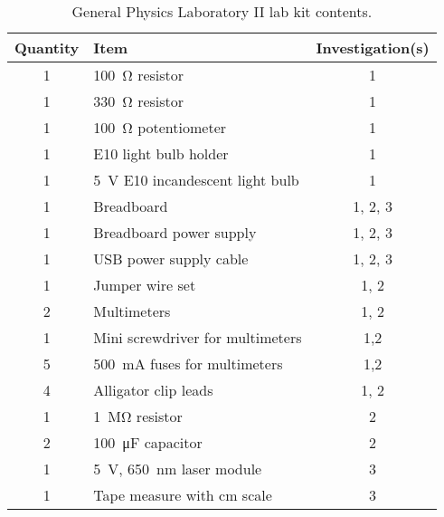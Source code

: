 \documentclass[aip, numerical, preprint]{revtex4-2}
\begin{document}
\begin{table}
  \caption{\label{tab: 1261 lab kit} General Physics Laboratory II lab kit contents.}
  \begin{tabular}{clc}
    \hline\hline
    Quantity & Item & Investigation(s)\\
    \hline
    1 & \SI{100}{\ohm} resistor & 1 \\
    1 & \SI{330}{\ohm} resistor & 1 \\
    1 & \SI{100}{\ohm} potentiometer & 1 \\
    1 & E10 light bulb holder & 1 \\
    1 & \SI{5}{V} E10 incandescent light bulb & 1 \\
    1 & Breadboard & 1, 2, 3 \\
    1 & Breadboard power supply & 1, 2, 3 \\
    1 & USB power supply cable & 1, 2, 3 \\
    1 & Jumper wire set & 1, 2 \\
    2 & Multimeters & 1, 2 \\
    1 & Mini screwdriver for multimeters & 1,2 \\
    5 & \SI{500}{mA} fuses for multimeters & 1,2 \\
    4 & Alligator clip leads & 1, 2 \\
    1 & \SI{1}{\mega\ohm} resistor & 2 \\
    2 & \SI{100}{\micro\farad} capacitor & 2 \\
    1 & \SI{5}{V}, \SI{650}{nm} laser module & 3 \\
    1 & Tape measure with cm scale & 3 \\            
    \hline\hline
  \end{tabular}
\end{table}

\clearpage


\end{document}
